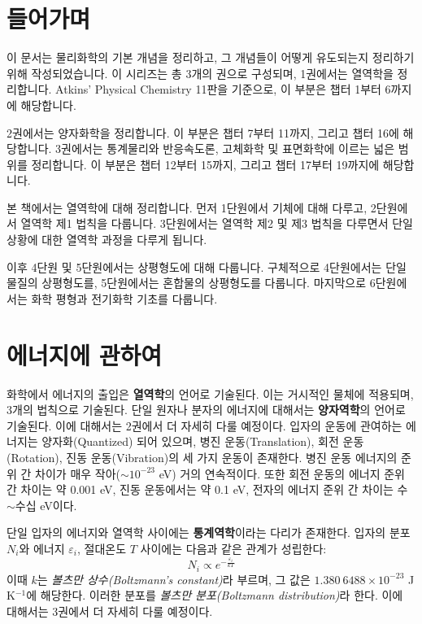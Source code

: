 \section{들어가며}
        \hspace{\parindent} 이 문서는 물리화학의 기본 개념을 정리하고, 그 개념들이 어떻게 유도되는지 정리하기 위해 작성되었습니다.
        이 시리즈는 총 3개의 권으로 구성되며, 1권에서는 열역학을 정리합니다. Atkins' Physical Chemistry 11판을 기준으로,
        이 부분은 챕터 1부터 6까지에 해당합니다.
        \par 2권에서는 양자화학을 정리합니다. 이 부분은 챕터 7부터 11까지, 그리고 챕터 16에 해당합니다. 3권에서는 통계물리와 반응속도론,
        고체화학 및 표면화학에 이르는 넓은 범위를 정리합니다. 이 부분은 챕터 12부터 15까지, 그리고 챕터 17부터 19까지에 해당합니다.
        \par 본 책에서는 열역학에 대해 정리합니다. 먼저 1단원에서 기체에 대해 다루고, 2단원에서 열역학 제1 법칙을 다룹니다. 
        3단원에서는 열역학 제2 및 제3 법칙을 다루면서 단일 상황에 대한 열역학 과정을 다루게 됩니다.
        \par 이후 4단원 및 5단원에서는 상평형도에 대해 
        다룹니다. 구체적으로 4단원에서는 단일 물질의 상평형도를, 5단원에서는 혼합물의 상평형도를 다룹니다. 마지막으로 6단원에서는 화학 평형과 
        전기화학 기초를 다룹니다.
\section{에너지에 관하여}
    \hspace{\parindent} 화학에서 에너지의 출입은 \textbf{열역학}의 언어로 기술된다. 이는 거시적인 물체에 적용되며, 3개의 법칙으로 기술된다. 
    단일 원자나 분자의 에너지에 대해서는 \textbf{양자역학}의 언어로 기술된다. 이에 대해서는 2권에서 더 자세히 다룰 예정이다. 
    입자의 운동에 관여하는 에너지는 양자화(Quantized) 되어 있으며, 병진 운동(Translation), 회전 운동(Rotation), 진동 운동(Vibration)의 
    세 가지 운동이 존재한다. 병진 운동 에너지의 준위 간 차이가 매우 작아($\sim 10^{-23}$ eV) 거의 연속적이다. 또한 
    회전 운동의 에너지 준위 간 차이는 약 0.001 eV, 진동 운동에서는 약 0.1 eV, 전자의 에너지 준위 간 차이는 수$\sim$수십 eV이다.
    \par 단일 입자의 에너지와 열역학 사이에는 \textbf{통계역학}이라는 다리가 존재한다. 입자의 분포 $N_i$와 에너지 $\varepsilon_{i}$, 
    절대온도 $T$ 사이에는 다음과 같은 관계가 성립한다:
    \begin{equation*}
        N_i \propto e^{- \frac{\varepsilon_{i}}{kT}}
    \end{equation*}
    이때 $k$는 \textit{볼츠만 상수(Boltzmann's constant)}라 부르며, 그 값은 $1.380 \ 6488 \times 10^{-23}$ \textrm{J K$^{-1}$}에 해당한다. 이러한 
    분포를 \textit{볼츠만 분포(Boltzmann distribution)}라 한다. 이에 대해서는 3권에서 더 자세히 다룰 예정이다.
\pagebreak